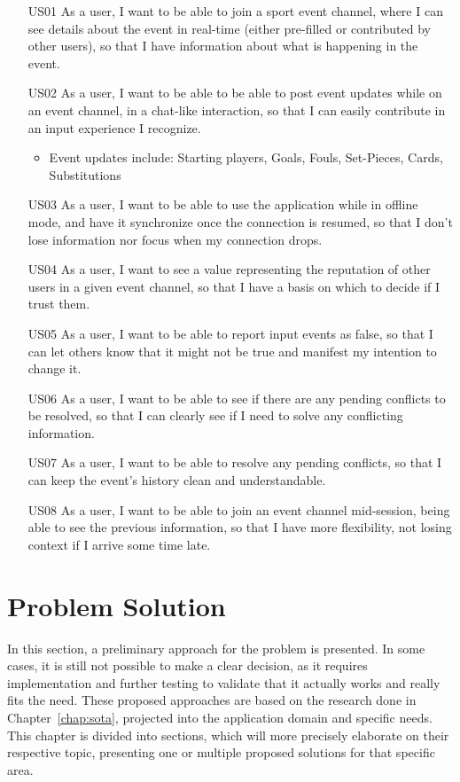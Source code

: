 \begin{itemize}[leftmargin  = 3.25\parindent, align=left]
    \item[US01] As a user, I want to be able to join a sport event channel, where I can see details about the event in real-time (either pre-filled or contributed by other users), so that I have information about what is happening in the event.
    \item[US02] As a user, I want to be able to be able to post event updates while on an event channel, in a chat-like interaction, so that I can easily contribute in an input experience I recognize.
    \begin{itemize}
        \item Event updates include: Starting players, Goals, Fouls, Set-Pieces, Cards, Substitutions
    \end{itemize} 
    \item[US03] As a user, I want to be able to use the application while in offline mode, and have it synchronize once the connection is resumed, so that I don't lose information nor focus when my connection drops.
    \item[US04] As a user, I want to see a value representing the reputation of other users in a given event channel, so that I have a basis on which to decide if I trust them. 
    \item[US05] As a user, I want to be able to report input events as false, so that I can let others know that it might not be true and manifest my intention to change it.
    \item[US06] As a user, I want to be able to see if there are any pending conflicts to be resolved, so that I can clearly see if I need to solve any conflicting information.
    \item[US07] As a user, I want to be able to resolve any pending conflicts, so that I can keep the event's history clean and understandable.
    \item[US08] As a user, I want to be able to join an event channel mid-session, being able to see the previous information, so that I have more flexibility, not losing context if I arrive some time late.
\end{itemize}

\section{Problem Solution}\label{sec:prob-sol}

In this section, a preliminary approach for the problem is presented. In some cases, it is still not possible to make a clear decision, as it requires implementation and further testing to validate that it actually works and really fits the need. These proposed approaches are based on the research done in Chapter~\ref{chap:sota}, projected into the application domain and specific needs. This chapter is divided into sections, which will more precisely elaborate on their respective topic, presenting one or multiple proposed solutions for that specific area. 

